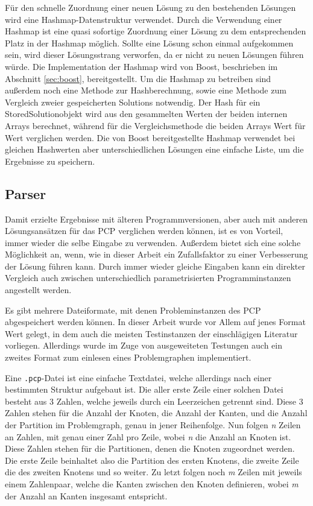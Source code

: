 Für den schnelle Zuordnung einer neuen Lösung zu den bestehenden Lösungen wird eine Hashmap-Datenstruktur verwendet. Durch die Verwendung einer
Hashmap ist eine quasi sofortige Zuordnung einer Lösung zu dem entsprechenden Platz in der Hashmap möglich. Sollte eine Lösung schon einmal 
aufgekommen sein, wird dieser Lösungsstrang verworfen, da er nicht zu neuen Lösungen führen würde. Die Implementation der Hashmap wird von 
Boost, beschrieben im Abschnitt \ref{sec:boost}, bereitgestellt. Um die Hashmap zu betreiben sind außerdem noch eine Methode zur Hashberechnung,
sowie eine Methode zum Vergleich zweier gespeicherten Solutions notwendig. Der Hash für ein StoredSolutionobjekt wird aus den gesammelten Werten
der beiden internen Arrays berechnet, während für die Vergleichsmethode die beiden Arrays Wert für Wert verglichen werden. Die von Boost 
bereitgestellte Hashmap verwendet bei gleichen Hashwerten aber unterschiedlichen Lösungen eine einfache Liste, um die Ergebnisse zu speichern.

\subsection{Parser}
\label{sec:parser}

Damit erzielte Ergebnisse mit älteren Programmversionen, aber auch mit anderen Lösungsansätzen für das PCP verglichen werden können, ist es von
Vorteil, immer wieder die selbe Eingabe zu verwenden. Außerdem bietet sich eine solche Möglichkeit an, wenn, wie in dieser Arbeit ein Zufallsfaktor
zu einer Verbesserung der Lösung führen kann. Durch immer wieder gleiche Eingaben kann ein direkter Vergleich auch zwischen unterschiedlich
parametrisierten Programminstanzen angestellt werden.

Es gibt mehrere Dateiformate, mit denen Probleminstanzen des PCP abgespeichert werden können. In dieser Arbeit wurde vor Allem auf jenes
Format Wert gelegt, in dem auch die meisten Testinstanzen der einschlägigen Literatur vorliegen. Allerdings wurde im Zuge von ausgeweiteten 
Testungen auch ein zweites Format zum einlesen eines Problemgraphen implementiert. 

Eine \texttt{.pcp}-Datei ist eine einfache Textdatei, welche allerdings nach einer bestimmten Struktur aufgebaut ist. Die aller erste Zeile
einer solchen Datei besteht aus 3 Zahlen, welche jeweils durch ein Leerzeichen getrennt sind. Diese 3 Zahlen stehen für die Anzahl der Knoten, 
die Anzahl der Kanten, und die Anzahl der Partition im Problemgraph, genau in jener Reihenfolge. Nun folgen \textit{n} Zeilen an Zahlen, mit 
genau einer Zahl pro Zeile, wobei \textit{n} die Anzahl an Knoten ist. Diese Zahlen stehen für die Partitionen, denen die Knoten zugeordnet werden.
Die erste Zeile beinhaltet also die Partition des ersten Knotens, die zweite Zeile die des zweiten Knotens und so weiter. Zu letzt folgen noch
\textit{m} Zeilen mit jeweils einem Zahlenpaar, welche die Kanten zwischen den Knoten definieren, wobei \textit{m} der Anzahl an Kanten insgesamt
entspricht.

